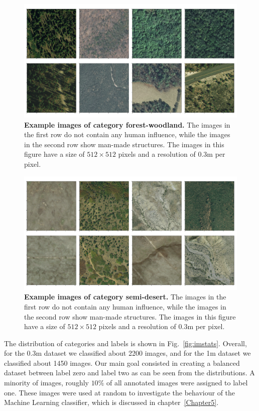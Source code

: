 \begin{figure}[H]
	\centering
	\captionsetup{width=1\linewidth}
	\includegraphics[width=1\textwidth]{Figures/forest-woodland_sample.pdf}
	\caption{\textbf{Example images of category forest-woodland.} The images in the first row do not contain any human influence, while the images in the second row show man-made structures. The images in this figure have a size of $512\times512$ pixels and a resolution of $0.3$m per pixel.}
	\label{fig:forest-sample}
\end{figure}

\begin{figure}[H]
	\centering
	\captionsetup{width=1\linewidth}
	\includegraphics[width=1\textwidth]{Figures/semi-desert_sample.pdf}
	\caption{\textbf{Example images of category semi-desert.} The images in the first row do not contain any human influence, while the images in the second row show man-made structures. The images in this figure have a size of $512\times512$ pixels and a resolution of $0.3$m per pixel.}
	\label{fig:desert-sample}
\end{figure}

The distribution of categories and labels is shown in Fig.~\ref{fig:imstats}. Overall, for the 0.3m dataset we classified about 2200 images, and for the 1m dataset we classified about 1450 images. Our main goal consisted in creating a balanced dataset between label zero and label two as can be seen from the distributions. A minority of images, roughly $10\%$ of all annotated images were assigned to label one. These images were used at random to investigate the behaviour of the Machine Learning classifier, which is discussed in chapter~\ref{Chapter5}.

